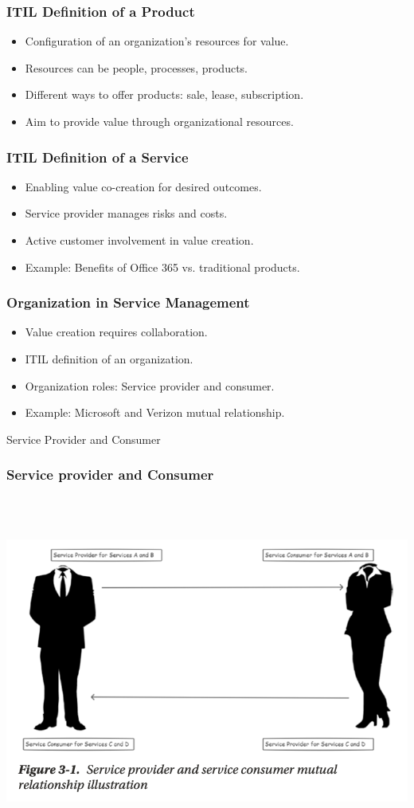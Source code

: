 \documentclass[aspectratio=169, table]{beamer}
\begin{document}
\begin{frame}
	\frametitle{ITIL Definition of a Product}
	\begin{itemize}
		\item Configuration of an organization's resources for value.
		\item Resources can be people, processes, products.
		\item Different ways to offer products: sale, lease, subscription.
		\item Aim to provide value through organizational resources.
	\end{itemize}
\end{frame}

\begin{frame}
	\frametitle{ITIL Definition of a Service}
	\begin{itemize}
		\item Enabling value co-creation for desired outcomes.
		\item Service provider manages risks and costs.
		\item Active customer involvement in value creation.
		\item Example: Benefits of Office 365 vs. traditional products.
	\end{itemize}
\end{frame}

\begin{frame}
	\frametitle{Organization in Service Management}
	\begin{itemize}
		\item Value creation requires collaboration.
		\item ITIL definition of an organization.
		\item Organization roles: Service provider and consumer.
		\item Example: Microsoft and Verizon mutual relationship.
	\end{itemize}
\end{frame}

\begin{frame}{Service Provider and Consumer} 	 \frametitle{Service provider and Consumer} \begin{center} 	\includegraphics[width=0.6\linewidth]{images/image-01.png} \end{center} \end{frame}
\end{document}
